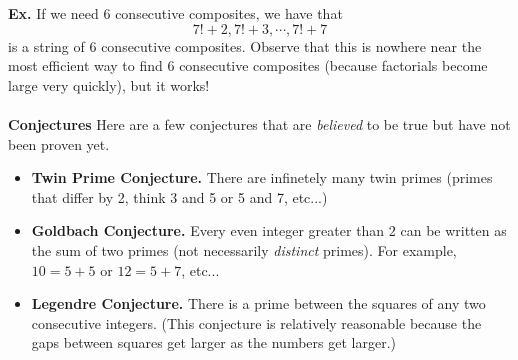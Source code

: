 \documentclass[class=article, crop=false]{standalone}
\begin{document}
\noindent\textbf{Ex.} If we need 6 consecutive composites, we have that $$7!+2, 7!+3,\cdots, 7!+7$$
is a string of 6 consecutive composites. Observe that this is nowhere near the most efficient way to find
6 consecutive composites (because factorials become large very quickly), but it works!\\\\
\textbf{Conjectures} Here are a few conjectures that are \emph{believed} to be true but have not been proven yet.
\begin{itemize}
	\item \textbf{Twin Prime Conjecture.} There are infinetely many twin primes (primes that differ by 2, think 
	3 and 5 or 5 and 7, etc...)
	\item \textbf{Goldbach Conjecture.} Every even integer greater than $2$ can be written as the sum of two primes
	(not necessarily \emph{distinct} primes). For example, $10=5+5$ or $12=5+7$, etc...
	\item \textbf{Legendre Conjecture.} There is a prime between the squares of any two consecutive integers.
	(This conjecture is relatively reasonable because the gaps between squares get larger as the numbers get larger.)
\end{itemize}
\end{document}
